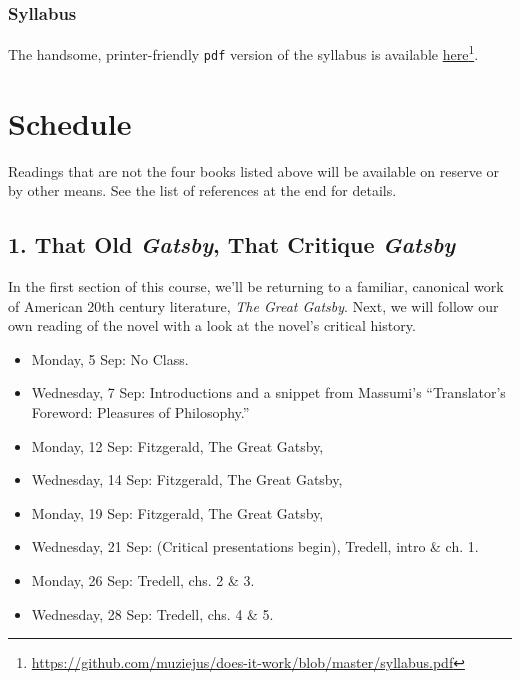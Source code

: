 \subsection{Syllabus}
\label{syllabus}

The handsome, printer-friendly \texttt{pdf} version of the syllabus is available \href{https://github.com/muziejus/does-it-work/blob/master/syllabus.pdf}{here}\footnote{\href{https://github.com/muziejus/does-it-work/blob/master/syllabus.pdf}{https:/\slash github.com\slash muziejus\slash does-it-work\slash blob\slash master\slash syllabus.pdf}}.

 \newpage 

\chapter{Schedule}
\label{schedule}

Readings that are not the four books listed above will be available on reserve
or by other means. See the list of references at the end for details.

\section{1. That Old \emph{Gatsby}, That Critique \emph{Gatsby}}
\label{1.thatoldgatsbythatcritiquegatsby}

In the first section of this course, we’ll be returning to a familiar,
canonical work of American 20th century literature, \emph{The Great Gatsby}. Next,
we will follow our own reading of the novel with a look at the novel’s critical
history. 

\begin{itemize}
\item Monday, 5 Sep: No Class.

\item Wednesday, 7 Sep: Introductions and a snippet from Massumi’s “Translator’s Foreword: Pleasures of Philosophy.”

\item Monday, 12 Sep: Fitzgerald, The Great Gatsby, 

\item Wednesday, 14 Sep: Fitzgerald, The Great Gatsby,

\item Monday, 19 Sep: Fitzgerald, The Great Gatsby,

\item Wednesday, 21 Sep: (Critical presentations begin), Tredell, intro \& ch. 1.

\item Monday, 26 Sep: Tredell, chs. 2 \& 3.

\item Wednesday, 28 Sep: Tredell, chs. 4 \& 5.

\end{itemize}

